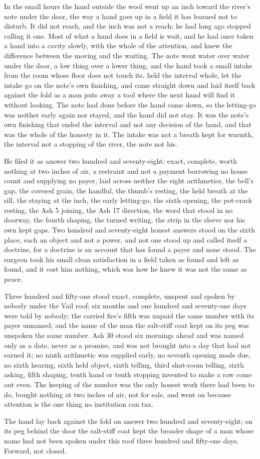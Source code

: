 In the small hours the hand outside the wool went up an inch toward the river’s note under the door, the way a hand goes up in a field it has learned not to disturb. It did not reach, and the inch was not a reach; he had long ago stopped calling it one. Most of what a hand does in a field is wait, and he had once taken a hand into a cavity slowly, with the whole of the attention, and knew the difference between the moving and the waiting. The note went water over water under the door, a low thing over a lower thing, and the hand took a small intake from the room whose floor does not touch its, held the interval whole, let the intake go on the note’s own finishing, and came straight down and laid itself back against the fold as a man puts away a tool where the next hand will find it without looking. The note had done before the hand came down, so the letting-go was neither early again nor stayed, and the hand did not stay. It was the note’s own finishing that ended the interval and not any decision of the hand, and that was the whole of the honesty in it. The intake was not a breath kept for warmth, the interval not a stopping of the river, the note not his.

He filed it as answer two hundred and seventy-eight: exact, complete, worth nothing at two inches of air, a restraint and not a payment borrowing no house count and supplying no payer, laid across neither the eight arithmetics, the bell’s gap, the covered grain, the handful, the thumb’s resting, the held breath at the sill, the staying at the inch, the early letting-go, the sixth opening, the pot-crack resting, the Ash 5 joining, the Ash 17 direction, the word that stood in no doorway, the fourth shaping, the turned writing, the strip in the sleeve nor his own kept gaps. Two hundred and seventy-eight honest answers stood on the sixth place, each an object and not a power, and not one stood up and called itself a doctrine, for a doctrine is an account that has found a payer and none stood. The surgeon took his small clean satisfaction in a field taken as found and left as found, and it cost him nothing, which was how he knew it was not the same as peace.

Three hundred and fifty-one stood exact, complete, unspent and spoken by nobody under the Vail roof; six months and one hundred and seventy-one days were told by nobody; the carried fire’s fifth was unpaid the same number with its payer unnamed; and the name of the man the salt-stiff coat kept on its peg was unspoken the same number. Ash 30 stood six mornings ahead and was named only as a date, never as a promise, and was not brought into a day that had not earned it; no ninth arithmetic was supplied early, no seventh opening made due, no sixth hearing, sixth held object, sixth telling, third shut-room telling, sixth asking, fifth shaping, tenth hand or tenth stopping invented to make a row come out even. The keeping of the number was the only honest work there had been to do, bought nothing at two inches of air, not for sale, and went on because attention is the one thing no institution can tax.

The hand lay back against the fold on answer two hundred and seventy-eight; on its peg behind the door the salt-stiff coat kept the broader shape of a man whose name had not been spoken under this roof three hundred and fifty-one days. Forward, not closed.

